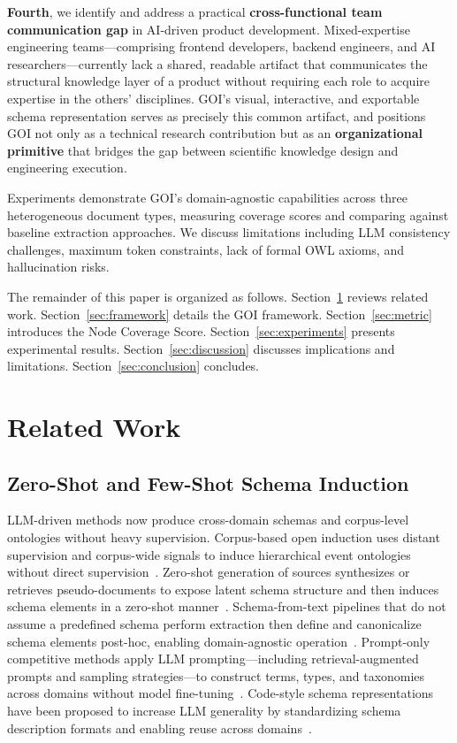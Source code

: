\documentclass[runningheads,a4paper]{llncs}
\begin{document}
\textbf{Fourth}, we identify and address a practical
\textbf{cross-functional team communication gap} in AI-driven product
development. Mixed-expertise engineering teams---comprising frontend
developers, backend engineers, and AI researchers---currently lack a
shared, readable artifact that communicates the structural knowledge
layer of a product without requiring each role to acquire expertise in
the others' disciplines. GOI's visual, interactive, and exportable
schema representation serves as precisely this common artifact, and
positions GOI not only as a technical research contribution but as an
\textbf{organizational primitive} that bridges the gap between
scientific knowledge design and engineering execution.

Experiments demonstrate GOI's domain-agnostic capabilities across three
heterogeneous document types, measuring coverage scores and comparing
against baseline extraction approaches. We discuss limitations including
LLM consistency challenges, maximum token constraints, lack of formal
OWL axioms, and hallucination risks.

The remainder of this paper is organized as follows.
Section~\ref{sec:related} reviews related work.
Section~\ref{sec:framework} details the GOI framework.
Section~\ref{sec:metric} introduces the Node Coverage Score.
Section~\ref{sec:experiments} presents experimental results.
Section~\ref{sec:discussion} discusses implications and limitations.
Section~\ref{sec:conclusion} concludes.

\section{Related Work}
\label{sec:related}

\subsection{Zero-Shot and Few-Shot Schema Induction}

LLM-driven methods now produce cross-domain schemas and corpus-level
ontologies without heavy supervision. Corpus-based open induction uses
distant supervision and corpus-wide signals to induce hierarchical event
ontologies without direct supervision~\cite{zhang2023ceo}. Zero-shot
generation of sources synthesizes or retrieves pseudo-documents to
expose latent schema structure and then induces schema elements in a
zero-shot manner~\cite{zhang2024zero}. Schema-from-text pipelines that
do not assume a predefined schema perform extraction then define and
canonicalize schema elements post-hoc, enabling domain-agnostic
operation~\cite{zhang2024edc}. Prompt-only competitive methods apply LLM
prompting---including retrieval-augmented prompts and sampling
strategies---to construct terms, types, and taxonomies across domains
without model fine-tuning~\cite{beliaeva2025}. Code-style schema
representations have been proposed to increase LLM generality by
standardizing schema description formats and enabling reuse across
domains~\cite{patel2024few}.
\end{document}
